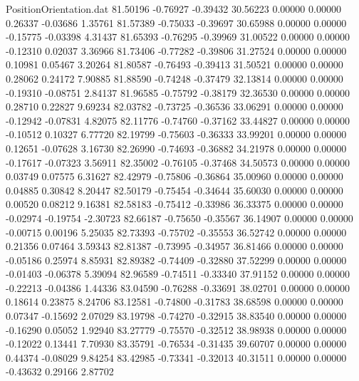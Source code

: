\begin{filecontents}{PositionOrientation.dat}
  81.50196   -0.76927   -0.39432    30.56223    0.00000    0.00000    0.26337   -0.03686    1.35761
  81.57389   -0.75033   -0.39697    30.65988    0.00000    0.00000   -0.15775   -0.03398    4.31437
  81.65393   -0.76295   -0.39969    31.00522    0.00000    0.00000   -0.12310    0.02037    3.36966
  81.73406   -0.77282   -0.39806    31.27524    0.00000    0.00000    0.10981    0.05467    3.20264
  81.80587   -0.76493   -0.39413    31.50521    0.00000    0.00000    0.28062    0.24172    7.90885
  81.88590   -0.74248   -0.37479    32.13814    0.00000    0.00000   -0.19310   -0.08751    2.84137
  81.96585   -0.75792   -0.38179    32.36530    0.00000    0.00000    0.28710    0.22827    9.69234
  82.03782   -0.73725   -0.36536    33.06291    0.00000    0.00000   -0.12942   -0.07831    4.82075
  82.11776   -0.74760   -0.37162    33.44827    0.00000    0.00000   -0.10512    0.10327    6.77720
  82.19799   -0.75603   -0.36333    33.99201    0.00000    0.00000    0.12651   -0.07628    3.16730
  82.26990   -0.74693   -0.36882    34.21978    0.00000    0.00000   -0.17617   -0.07323    3.56911
  82.35002   -0.76105   -0.37468    34.50573    0.00000    0.00000    0.03749    0.07575    6.31627
  82.42979   -0.75806   -0.36864    35.00960    0.00000    0.00000    0.04885    0.30842    8.20447
  82.50179   -0.75454   -0.34644    35.60030    0.00000    0.00000    0.00520    0.08212    9.16381
  82.58183   -0.75412   -0.33986    36.33375    0.00000    0.00000   -0.02974   -0.19754   -2.30723
  82.66187   -0.75650   -0.35567    36.14907    0.00000    0.00000   -0.00715    0.00196    5.25035
  82.73393   -0.75702   -0.35553    36.52742    0.00000    0.00000    0.21356    0.07464    3.59343
  82.81387   -0.73995   -0.34957    36.81466    0.00000    0.00000   -0.05186    0.25974    8.85931
  82.89382   -0.74409   -0.32880    37.52299    0.00000    0.00000   -0.01403   -0.06378    5.39094
  82.96589   -0.74511   -0.33340    37.91152    0.00000    0.00000   -0.22213   -0.04386    1.44336
  83.04590   -0.76288   -0.33691    38.02701    0.00000    0.00000    0.18614    0.23875    8.24706
  83.12581   -0.74800   -0.31783    38.68598    0.00000    0.00000    0.07347   -0.15692    2.07029
  83.19798   -0.74270   -0.32915    38.83540    0.00000    0.00000   -0.16290    0.05052    1.92940
  83.27779   -0.75570   -0.32512    38.98938    0.00000    0.00000   -0.12022    0.13441    7.70930
  83.35791   -0.76534   -0.31435    39.60707    0.00000    0.00000    0.44374   -0.08029    9.84254
  83.42985   -0.73341   -0.32013    40.31511    0.00000    0.00000   -0.43632    0.29166    2.87702

\end{filecontents}

